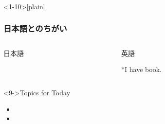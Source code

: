 \documentclass[aspectratio=169]{beamer}
\begin{document}
\begin{frame}<1-10>[plain]\frametitle{日本語とのちがい}
\begin{columns}
\begin{column}[t]{.45\textwidth}
\begin{block}{日本語}


\end{block}
\end{column}
\begin{column}[t]{.45\textwidth}
\begin{block}{英語}


*{I have \textcolor{red!50}{book}.}
\end{block}
\end{column}
\end{columns}

\begin{exampleblock}<9->{Topics for Today}
\begin{itemize}
 \item<1->  
 \item<2->  
\end{itemize}
      \end{exampleblock}




\end{frame}
\end{document}
